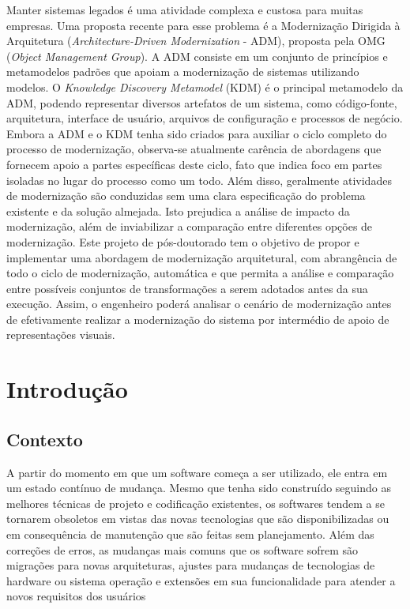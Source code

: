 \documentclass[12pt]{article}
\begin{document}
 

\setlength{\voffset}{0cm}
\setlength{\hoffset}{0cm}



\begin{resumo}
Manter sistemas legados é uma atividade complexa e custosa para muitas empresas. Uma proposta recente para esse problema é a Modernização Dirigida à Arquitetura (\textit{Architecture-Driven Modernization} - ADM), proposta pela OMG (\textit{Object Management Group}). A ADM consiste em um conjunto de princípios e metamodelos padrões que apoiam a modernização de sistemas utilizando modelos. O \textit{Knowledge Discovery Metamodel} (KDM) é o principal metamodelo da ADM, podendo representar diversos artefatos de um sistema, como código-fonte, arquitetura, interface de usuário, arquivos de configuração e processos de negócio. Embora a ADM e o KDM tenha sido criados para auxiliar o ciclo completo do processo de modernização, observa-se atualmente carência de abordagens que fornecem apoio a partes específicas deste ciclo, fato que indica foco em partes isoladas no lugar do processo como um todo. Além disso, geralmente atividades de modernização são conduzidas sem uma clara especificação do problema existente e da solução almejada. Isto prejudica a análise de impacto da modernização, além de inviabilizar a comparação entre diferentes opções de modernização. Este projeto de pós-doutorado tem o objetivo de propor e implementar uma abordagem de modernização arquitetural, com abrangência de todo o ciclo de modernização, automática e que permita a análise e comparação entre possíveis conjuntos de transformações a serem adotados antes da sua execução. Assim, o engenheiro poderá analisar o cenário de modernização antes de efetivamente realizar a modernização do sistema por intermédio de apoio de representações visuais.
\end{resumo}

\section{Introdução}

\subsection{Contexto}

A partir do momento em que um software começa a ser utilizado, ele entra em um estado contínuo de mudança. Mesmo que tenha sido construído seguindo as melhores técnicas de projeto e codificação existentes, os softwares tendem a se tornarem obsoletos em vistas das novas tecnologias que são disponibilizadas ou em consequência de manutenção que são feitas sem planejamento. Além das correções de erros, as mudanças mais comuns que os software sofrem são migrações para novas arquiteturas, ajustes para mudanças de tecnologias de hardware ou sistema operação e extensões em sua funcionalidade para atender a novos requisitos dos usuários~\cite{Krueger92, SoftwareReuse}
\end{document}
